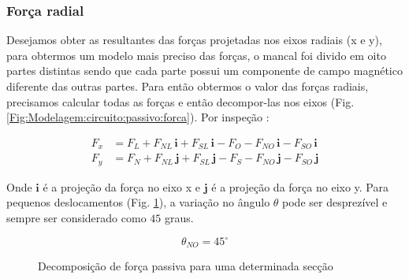 \subsubsection{Força radial} \label{subsection:forca:x}


Desejamos obter as resultantes das forças projetadas nos eixos radiais (x e y), para obtermos um modelo mais preciso das forças, o mancal foi divido em oito partes distintas sendo que cada parte possui um componente de campo magnético diferente das outras partes. Para então obtermos o valor das forças radiais, precisamos calcular todas as forças e então decompor-las nos eixos (Fig. \ref{Fig:Modelagem:circuito:passivo:forca}). Por inspeção :

\begin{align}
	F_x &= F_{L} + F_{NL} \, \boldsymbol{i} + F_{SL} \, \boldsymbol{i} - F_{O} - F_{NO} \, \boldsymbol{i}  - F_{SO} \, \boldsymbol{i} \label{eq:p:F:resultante:x} \\
	F_y &= F_{N} + F_{NL} \, \boldsymbol{j} + F_{SL} \, \boldsymbol{j} - F_{S} - F_{NO} \, \boldsymbol{j}  - F_{SO} \, \boldsymbol{j}
	\label{eq:p:F:resultante:y} 
\end{align}

Onde $\boldsymbol{i}$ é a projeção da força no eixo x e $\boldsymbol{j}$ é a projeção da força no eixo y. Para pequenos deslocamentos (Fig. \ref{fig:Passivo:gap}), a variação no ângulo $\theta$ pode ser desprezível e sempre ser considerado como $45$ graus.


\[
\theta_{NO} = 45^{\circ}
\]

 	\begin{figure}[!ht]
 		\centering
			
 			\caption{Decomposição de força passiva para uma determinada secção}
 			\label{fig:Passivo:gap}
 	\end{figure}



%
%

